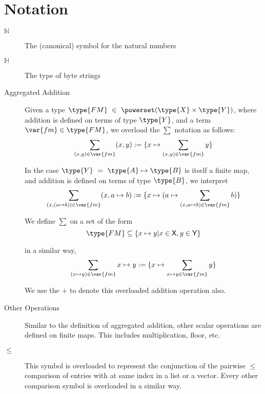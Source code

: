 \section{Notation}
\label{sec:notation-shelley}


\begin{description}
  \item[$\mathbb{N}$] The (canonical) symbol for the natural numbers
  \item[$\mathbb{H}$] The type of byte strings
  \item[Aggregated Addition] Given a type
  $\type{FM}~\in~ \powerset(\type{X} \times \type{Y})$,
    where addition is defined on terms of type $\type{Y}$, and a term $\var{fm} \in \type{FM}$,
    we overload the $\sum$ notation as follows:
    \[\sum_{(x, y)\in\var{fm}} (x,y) :=
    \{ x\mapsto \sum_{(x,y)\in\var{fm}} y \} \]

    In the case $\type{Y}~=~\type{A}\mapsto\type{B}$ is itself a finite map,
    and addition is defined on terms of type $\type{B}$,
    we interpret
    \[\sum_{(x, (a\mapsto b))\in\var{fm}} (x,a\mapsto b) :=
    \{ x \mapsto (a\mapsto \sum_{(x,a\mapsto b)\in\var{fm}} b) \} \]

    We define $\sum$ on a set of the form
    \[\type{FM} \subseteq \{ x \mapsto y \vert x \in \mathsf{X}, y \in \mathsf{Y} \} \]

    in a similar way,
    \[\sum_{(x\mapsto y)\in\var{fm}} x \mapsto y :=
    \{ x\mapsto \sum_{x\mapsto y\in\var{fm}} y \} \]

    We use the $+$ to denote this overloaded addition operation also.

  \item[Other Operations] Similar to the definition of aggregated addition,
  other scalar operations are defined on finite maps. This includes multiplication,
  floor, etc.

  \item[$\leq$] This symbol is overloaded to represent the conjunction of the
  pairwise $\leq$ comparison of entries with at same index in a list or a vector.
  Every other comparison symbol is overloaded in a similar way.

\end{description}
\clearpage
